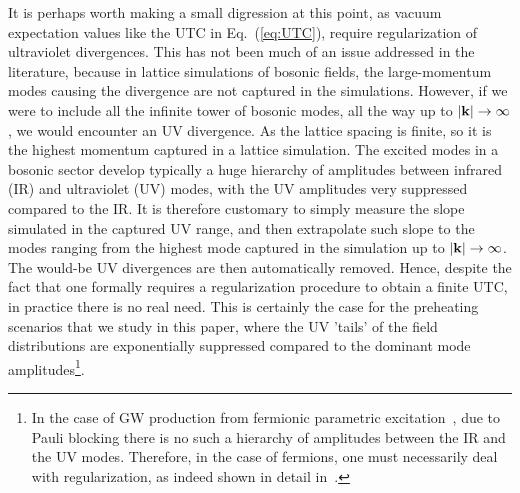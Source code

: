 \documentclass[a4paper,11pt]{article}
\begin{document}
It is perhaps worth making a small digression at this point, as vacuum expectation values like the UTC in Eq.~(\ref{eq:UTC}), require regularization of ultraviolet divergences. This has not been much of an issue addressed in the literature, because in lattice simulations of bosonic fields, the large-momentum modes causing the divergence are not captured in the simulations. However, if we were to include all the infinite tower of bosonic modes, all the way up to $|{\bf k}| \rightarrow \infty$, we would encounter an UV divergence. As the lattice spacing is finite, so it is the highest momentum captured in a lattice simulation. The excited modes in a bosonic sector develop typically a huge hierarchy of amplitudes between infrared (IR) and ultraviolet (UV) modes, with the UV amplitudes very suppressed compared to the IR. It is therefore customary to simply measure the slope simulated in the captured UV range, and then extrapolate such slope to the modes ranging from the highest mode captured in the simulation up to $|{\bf k}| \rightarrow \infty$. The would-be UV divergences are then automatically removed. Hence, despite the fact that one formally requires a regularization procedure to obtain a finite UTC, in practice there is no real need. This is certainly the case for the preheating scenarios that we study in this paper, where the UV 'tails' of the field distributions are exponentially suppressed compared to the dominant mode amplitudes\footnote{In the case of GW production from fermionic parametric excitation~\cite{Enqvist:2012im,Figueroa:2013vif,Figueroa:2014aya}, due to Pauli blocking there is no such a hierarchy of amplitudes between the IR and the UV modes. Therefore, in the case of fermions, one must necessarily deal with regularization, as indeed shown in detail in~\cite{Figueroa:2013vif}.}. 
\end{document}
